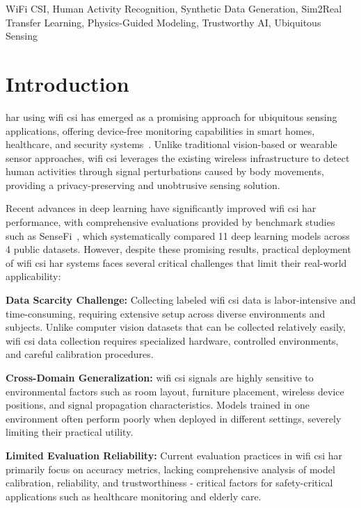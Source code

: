\documentclass[journal]{IEEEtran}
\begin{document}
\begin{IEEEkeywords}
WiFi CSI, Human Activity Recognition, Synthetic Data Generation, Sim2Real Transfer Learning, Physics-Guided Modeling, Trustworthy AI, Ubiquitous Sensing
\end{IEEEkeywords}

\section{Introduction}

\gls{har} using \gls{wifi} \gls{csi} has emerged as a promising approach for ubiquitous sensing applications, offering device-free monitoring capabilities in smart homes, healthcare, and security systems~\cite{csi_survey2019}. Unlike traditional vision-based or wearable sensor approaches, \gls{wifi} \gls{csi} leverages the existing wireless infrastructure to detect human activities through signal perturbations caused by body movements, providing a privacy-preserving and unobtrusive sensing solution.

Recent advances in deep learning have significantly improved \gls{wifi} \gls{csi} \gls{har} performance, with comprehensive evaluations provided by benchmark studies such as SenseFi~\cite{yang2023sensefi}, which systematically compared 11 deep learning models across 4 public datasets. However, despite these promising results, practical deployment of \gls{wifi} \gls{csi} \gls{har} systems faces several critical challenges that limit their real-world applicability:

\textbf{Data Scarcity Challenge:} Collecting labeled \gls{wifi} \gls{csi} data is labor-intensive and time-consuming, requiring extensive setup across diverse environments and subjects. Unlike computer vision datasets that can be collected relatively easily, \gls{wifi} \gls{csi} data collection requires specialized hardware, controlled environments, and careful calibration procedures.

\textbf{Cross-Domain Generalization:} \gls{wifi} \gls{csi} signals are highly sensitive to environmental factors such as room layout, furniture placement, wireless device positions, and signal propagation characteristics. Models trained in one environment often perform poorly when deployed in different settings, severely limiting their practical utility.

\textbf{Limited Evaluation Reliability:} Current evaluation practices in \gls{wifi} \gls{csi} \gls{har} primarily focus on accuracy metrics, lacking comprehensive analysis of model calibration, reliability, and trustworthiness - critical factors for safety-critical applications such as healthcare monitoring and elderly care.
\end{document}
